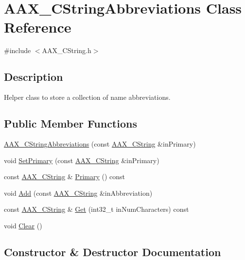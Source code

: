 \hypertarget{a01577}{}\section{A\+A\+X\+\_\+\+C\+String\+Abbreviations Class Reference}
\label{a01577}


{\ttfamily \#include $<$A\+A\+X\+\_\+\+C\+String.\+h$>$}



\subsection{Description}
Helper class to store a collection of name abbreviations. \subsection*{Public Member Functions}
\begin{DoxyCompactItemize}
\item 
\mbox{\hyperlink{a01577_a318a77942cf3963f2eda432ba4e1d759}{A\+A\+X\+\_\+\+C\+String\+Abbreviations}} (const \mbox{\hyperlink{a01573}{A\+A\+X\+\_\+\+C\+String}} \&in\+Primary)
\item 
void \mbox{\hyperlink{a01577_adab8aa7dbc6c1cc8d9d4e8702a55f149}{Set\+Primary}} (const \mbox{\hyperlink{a01573}{A\+A\+X\+\_\+\+C\+String}} \&in\+Primary)
\item 
const \mbox{\hyperlink{a01573}{A\+A\+X\+\_\+\+C\+String}} \& \mbox{\hyperlink{a01577_acff0707d73249820d7863da3633b1bf9}{Primary}} () const
\item 
void \mbox{\hyperlink{a01577_a840d1e71735c21a38136812a01693f91}{Add}} (const \mbox{\hyperlink{a01573}{A\+A\+X\+\_\+\+C\+String}} \&in\+Abbreviation)
\item 
const \mbox{\hyperlink{a01573}{A\+A\+X\+\_\+\+C\+String}} \& \mbox{\hyperlink{a01577_af21dca22bf79b4921f81432ba4e99223}{Get}} (int32\+\_\+t in\+Num\+Characters) const
\item 
void \mbox{\hyperlink{a01577_a6f909da041fa1bd21dfa28f1e384417e}{Clear}} ()
\end{DoxyCompactItemize}


\subsection{Constructor \& Destructor Documentation}
\mbox{\label{a01577_a318a77942cf3963f2eda432ba4e1d759}} 
